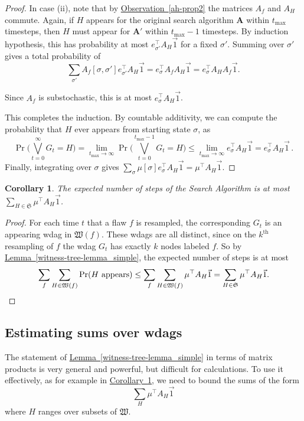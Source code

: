 \documentclass[11pt]{article}
\newcommand{\expref}[2]{\texorpdfstring{\hyperref[#2]{#1~\ref{#2}}}{#1~\ref{#2}}}
\newtheorem{corollary}[theorem]{Corollary}
\begin{document}
\begin{proof}
In case (ii), note that by \expref{Observation}{ah-prop2} the matrices $A_f$ and $A_H$ commute. Again, if $H$ appears for the original search algorithm $\mathbf A$ within $t_{\max}$ timesteps, then   $H$ must appear for $\mathbf A'$ within $t_{\max}-1$ timesteps. By induction hypothesis, this has  probability at most $e_{\sigma'}^{\top} A_H \vec 1$ for a fixed $\sigma'$. Summing over $\sigma'$ gives a total probability of 
$$
\sum_{\sigma'} A_f[\sigma, \sigma'] e_{\sigma'}^{\top} A_{H} \vec 1 = e_{\sigma}^{\top} A_f  A_{H} \vec 1 = e_{\sigma}^{\top} A_H A_f \vec 1.
$$

Since $A_f$ is substochastic, this is at most $e_{\sigma}^{\top} A_H \vec 1$.

This completes the induction. By countable additivity, we can compute the probability that $H$ ever appears from starting state $\sigma$, as 
$$
\Pr \bigl( \bigvee_{t=0}^{\infty} G_t = H \bigr)= \lim_{t_{\max} \rightarrow \infty} \Pr \bigl( \bigvee_{t=0}^{t_{\max}-1} G_t = H \bigr) \leq  \lim_{t_{\max} \rightarrow \infty} e_{\sigma}^{\top} A_H \vec 1 = e_{\sigma}^{\top} A_H \vec 1\,.
$$
Finally, integrating over $\sigma$ gives $\sum_{\sigma} \mu[\sigma] e_{\sigma}^{\top} A_H \vec 1 =  \mu^{\top} A_H \vec 1$.
\end{proof}


\begin{corollary}
\label{stepscor}
The expected number of steps of the Search Algorithm is at most $ \sum_{H \in \mathfrak S} \mu^{\top} A_H \vec 1$. 
\end{corollary}
\begin{proof}
  For each time $t$ that a flaw  $f$ is resampled, the corresponding $G_t$ is an appearing wdag in $\mathfrak W(f)$. These wdags are all  distinct, since on the $k^{\text{th}}$ resampling of $f$ the wdag $G_t$ has exactly $k$ nodes labeled $f$. So by
%
%
\expref{Lemma}{witness-tree-lemma_simple},   %
%
the expected number of steps is at most \[
\sum_f \sum_{H \in \mathfrak W(f)} \Pr(\text{$H$ appears}) \leq \sum_f \sum_{H \in \mathfrak W(f)} \mu^{\top} A_H \vec 1 = \sum_{H \in \mathfrak S} \mu^{\top} A_H \vec 1. \qedhere
\]
\end{proof}


\subsection{Estimating sums over wdags}
\label{sec-est}
The statement of \expref{Lemma}{witness-tree-lemma_simple} 
in terms of matrix products is very general and powerful, but difficult for calculations.  To use it effectively, as for example in \expref{Corollary}{stepscor}, we need to bound the sums of the form
$$
  \sum_{H}  \mu^{\top} A_H \vec 1
$$
where $H$ ranges over subsets of $\mathfrak W$. 
\end{document}
